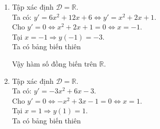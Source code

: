 \begin{bt}
{\begin{enumerate}
\begin{center}
            \end{center}
            Hàm số nghịch biến trên các khoảng $(-\infty;-1)$ và $(3;+\infty)$; đồng biến trên khoảng $(-1;3)$.
            \item
            Tập xác định $\mathscr{D}=\mathbb{R}$.\\
            Ta có: $y'=6x^2+12x+6 \Leftrightarrow y'=x^2+2x+1$.\\
            Cho $y'=0 \Leftrightarrow x^2+2x+1=0 \Leftrightarrow x=-1$.\\
            Tại $x=-1 \Rightarrow y(-1)=-3$.\\
            Ta có bảng biến thiên
            \begin{center}
            \end{center}
            Vậy hàm số đồng biến trên $\mathbb{R}$.
            \item
            Tập xác định $\mathscr{D}=\mathbb{R}$.\\
            Ta có: $y'=-3x^2+6x-3$.\\
            Cho $y'=0 \Leftrightarrow -x^2+3x-1=0 \Leftrightarrow x=1$.\\
            Tại $x=1 \Rightarrow y(1)=1$.\\
            Ta có bảng biến thiên
            \begin{center}

\end{center}
\end{enumerate}}
\end{bt}
